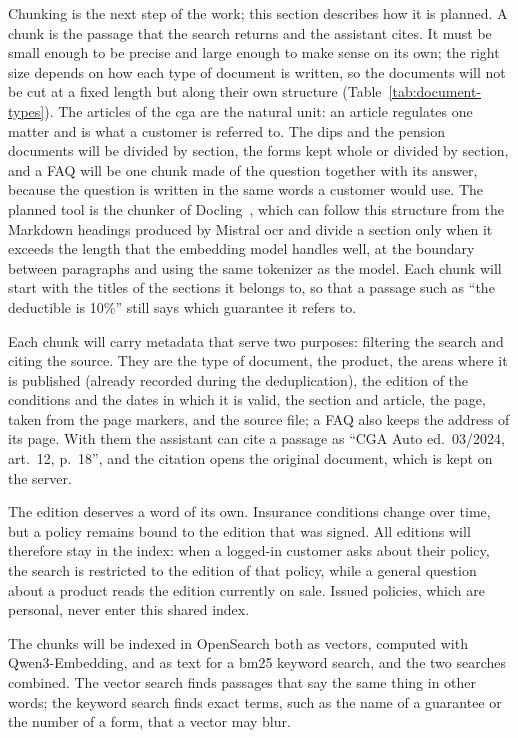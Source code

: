 Chunking is the next step of the work; this section describes how it is planned. A chunk is the
passage that the search returns and the assistant cites. It must be small enough to be precise and
large enough to make sense on its own; the right size depends on how each type of document is
written, so the documents will not be cut at a fixed length but along their own structure
(Table~\ref{tab:document-types}). The articles of the \ac{cga} are the natural unit: an article
regulates one matter and is what a customer is referred to. The \acp{dip} and the pension documents
will be divided by section, the forms kept whole or divided by section, and a FAQ will be one chunk
made of the question together with its answer, because the question is written in the same words a
customer would use. The planned tool is the chunker of Docling~\cite{docling2026catalog}, which can
follow this structure from the Markdown headings produced by Mistral \ac{ocr} and divide a section
only when it exceeds the length that the embedding model handles well, at the boundary between
paragraphs and using the same tokenizer as the model. Each chunk will start with the titles of the
sections it belongs to, so that a passage such as \enquote{the deductible is 10\%} still says which
guarantee it refers to.

Each chunk will carry metadata that serve two purposes: filtering the search and citing the source.
They are the type of document, the product, the areas where it is published (already recorded
during the deduplication), the edition of the conditions and the dates in which it is valid, the
section and article, the page, taken from the page markers, and the source file; a FAQ also keeps
the address of its page. With them the assistant can cite a passage as \enquote{CGA Auto
ed.~03/2024, art.~12, p.~18}, and the citation opens the original document, which is kept on the
server.

The edition deserves a word of its own. Insurance conditions change over time, but a policy remains
bound to the edition that was signed. All editions will therefore stay in the index: when a logged-in
customer asks about their policy, the search is restricted to the edition of that policy, while a
general question about a product reads the edition currently on sale. Issued policies, which are
personal, never enter this shared index.

The chunks will be indexed in OpenSearch both as vectors, computed with Qwen3-Embedding, and as
text for a \ac{bm25} keyword search, and the two searches combined. The vector search finds passages
that say the same thing in other words; the keyword search finds exact terms, such as the name of a
guarantee or the number of a form, that a vector may blur.

